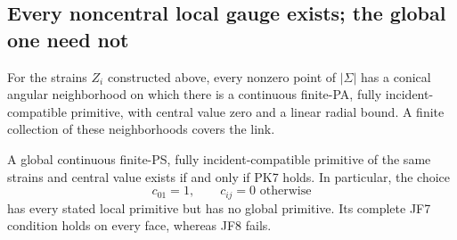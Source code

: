 \subsection{Every noncentral local gauge exists; the global one need not}

\begin{theorem}
\label{thm:r13-positive-angular-not-global-gauge}
For the strains \(Z_i\) constructed above, every nonzero point
of \(|\Sigma|\) has a conical angular neighborhood on which
there is a continuous finite-PA, fully incident-compatible
primitive, with central value zero and a linear radial bound.
A finite collection of these neighborhoods covers the link.

A global continuous finite-PS, fully incident-compatible
primitive of the same strains and central value exists if and
only if PK7 holds.  In particular, the choice
\[
                 c_{01}=1,\qquad c_{ij}=0\text{ otherwise}
 \tag{PK10}
\]
has every stated local primitive but has no global primitive.
Its complete JF7 condition holds on every face, whereas JF8 fails.
\end{theorem}

